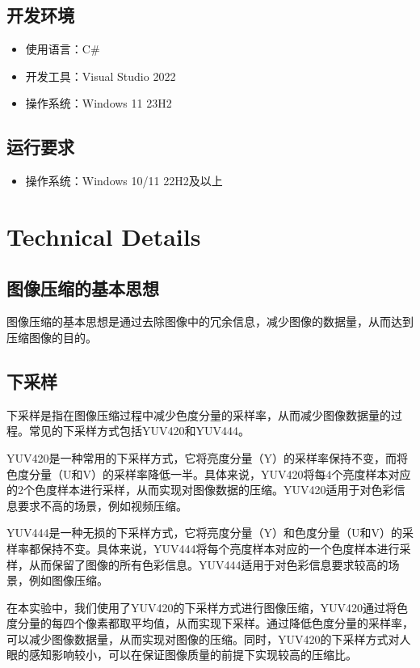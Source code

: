 \documentclass{article}
\begin{document}
\subsection{开发环境}

\begin{itemize}
    \item 使用语言：C\#
    \item 开发工具：Visual Studio 2022
    \item 操作系统：Windows 11 23H2
\end{itemize}

\subsection{运行要求}

\begin{itemize}
    \item 操作系统：Windows 10/11 22H2及以上
\end{itemize}

\section{Technical Details}

\subsection{图像压缩的基本思想}

图像压缩的基本思想是通过去除图像中的冗余信息，减少图像的数据量，从而达到压缩图像的目的。

\subsection{下采样}

下采样是指在图像压缩过程中减少色度分量的采样率，从而减少图像数据量的过程。常见的下采样方式包括YUV420和YUV444。

YUV420是一种常用的下采样方式，它将亮度分量（Y）的采样率保持不变，而将色度分量（U和V）的采样率降低一半。具体来说，YUV420将每4个亮度样本对应的2个色度样本进行采样，从而实现对图像数据的压缩。YUV420适用于对色彩信息要求不高的场景，例如视频压缩。

YUV444是一种无损的下采样方式，它将亮度分量（Y）和色度分量（U和V）的采样率都保持不变。具体来说，YUV444将每个亮度样本对应的一个色度样本进行采样，从而保留了图像的所有色彩信息。YUV444适用于对色彩信息要求较高的场景，例如图像压缩。

在本实验中，我们使用了YUV420的下采样方式进行图像压缩，YUV420通过将色度分量的每四个像素都取平均值，从而实现下采样。通过降低色度分量的采样率，可以减少图像数据量，从而实现对图像的压缩。同时，YUV420的下采样方式对人眼的感知影响较小，可以在保证图像质量的前提下实现较高的压缩比。
\end{document}

